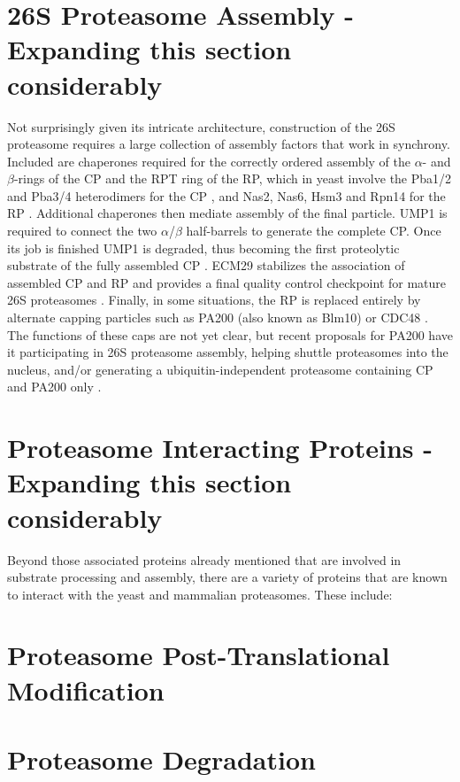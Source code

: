 \section{26S Proteasome Assembly - Expanding this section considerably}
	Not surprisingly given its intricate architecture, construction of the 26S proteasome requires a large collection of assembly factors that work in synchrony.  Included are chaperones required for the correctly ordered assembly of the $\alpha$- and $\beta$-rings of the CP and the RPT ring of the RP, which in yeast involve the Pba1/2 and Pba3/4 heterodimers for the CP \citep{kusmierczyk08, le07, tomko13}, and Nas2, Nas6, Hsm3 and Rpn14 for the RP \citep{funakoshi09, roelofs09, saeki09, tomko13}.  Additional chaperones then mediate assembly of the final particle.  UMP1 is required to connect the two $\alpha$/$\beta$ half-barrels to generate the complete CP.  Once its job is finished UMP1 is degraded, thus becoming the first proteolytic substrate of the fully assembled CP \citep{ramos98}.  ECM29 stabilizes the association of assembled CP and RP and provides a final quality control checkpoint for mature 26S proteasomes \citep{besche14, lehmann10}.  Finally, in some situations, the RP is replaced entirely by alternate capping particles such as PA200 (also known as Blm10) or CDC48 \citep{barthelme12, book10, schmidt05}.  The functions of these caps are not yet clear, but recent proposals for PA200 have it participating in 26S proteasome assembly, helping shuttle proteasomes into the nucleus, and/or generating a ubiquitin-independent proteasome containing CP and PA200 only \citep{dange11, sadre-bazzaz10, weberruss13}.

\section{Proteasome Interacting Proteins - Expanding this section considerably}
Beyond those associated proteins already mentioned that are involved in substrate processing and assembly, there are a variety of proteins that are known to interact with the yeast and mammalian proteasomes. These include:

\section{Proteasome Post-Translational Modification}

\section{Proteasome Degradation}




